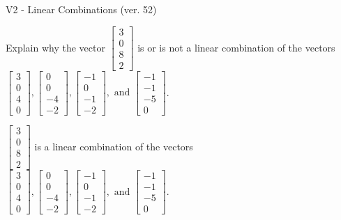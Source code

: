 \begin{exercise}
  \begin{exerciseTitle}V2 - Linear Combinations (ver. 52)\end{exerciseTitle}
  \begin{exerciseStatement}
    Explain why the vector \(\left[\begin{array}{c}
3 \\
0 \\
8 \\
2
\end{array}\right]\)  is or is not a linear 
	combination of the vectors \(\left[\begin{array}{c}
3 \\
0 \\
4 \\
0
\end{array}\right] , \left[\begin{array}{c}
0 \\
0 \\
-4 \\
-2
\end{array}\right] , \left[\begin{array}{c}
-1 \\
0 \\
-1 \\
-2
\end{array}\right] , \text{ and } \left[\begin{array}{c}
-1 \\
-1 \\
-5 \\
0
\end{array}\right]\).
	


  \end{exerciseStatement}
  \begin{exerciseAnswer}
   \(\left[\begin{array}{c}
3 \\
0 \\
8 \\
2
\end{array}\right]\) 
  	 is  
	a linear combination of the vectors \(\left[\begin{array}{c}
3 \\
0 \\
4 \\
0
\end{array}\right] , \left[\begin{array}{c}
0 \\
0 \\
-4 \\
-2
\end{array}\right] , \left[\begin{array}{c}
-1 \\
0 \\
-1 \\
-2
\end{array}\right] , \text{ and } \left[\begin{array}{c}
-1 \\
-1 \\
-5 \\
0
\end{array}\right]\).


\end{exerciseAnswer}
\end{exercise}
